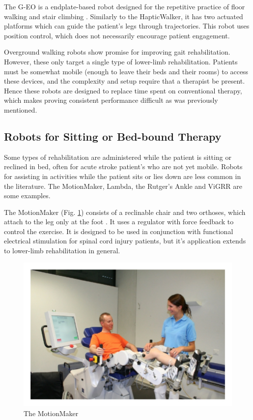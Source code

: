\documentclass[12pt]{report}
\begin{document}
	The G-EO is a endplate-based robot designed for the repetitive practice of floor walking and stair climbing \cite{Hesse2010}. Similarly to the HapticWalker, it has two actuated platforms which can guide the patient's legs through trajectories. This robot uses position control, which does not necessarily encourage patient engagement. 
	
	
	Overground walking robots show promise for improving gait rehabilitation. However, these only target a single type of lower-limb rehabilitation. Patients must be somewhat mobile (enough to leave their beds and their rooms) to access these devices, and the complexity and setup require that a therapist be present. Hence these robots are designed to replace time spent on conventional therapy, which makes proving consistent performance difficult as was previously mentioned. 
	
	\subsection{Robots for Sitting or Bed-bound Therapy}
	
	Some types of rehabilitation are administered while the patient is sitting or reclined in bed, often for acute stroke patient's who are not yet mobile. Robots for assisting in activities while the patient sits or lies down are less common in the literature. The MotionMaker, Lambda, the Rutger's Ankle and ViGRR are some examples. 
	
	The MotionMaker (Fig. \ref{fig:Motionmaker}) consists of a reclinable chair and two orthoses, which attach to the leg only at the foot \cite{Schmitt2004}. It uses a regulator with force feedback to control the exercise. It is designed to be used in conjunction with functional electrical stimulation for spinal cord injury patients, but it's application extends to lower-limb rehabilitation in general. 
	
	\begin{figure}[h] 
		\centering
		\includegraphics[width=0.75\linewidth]{Motionmaker}
		\caption{The MotionMaker}
		\label{fig:Motionmaker}
	\end{figure}
	
\end{document}
